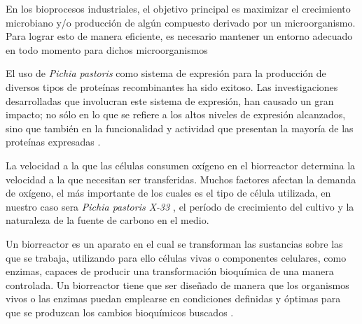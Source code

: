 \setlength{\parindent}{25pt}
\onehalfspacing
{}

En los bioprocesos industriales, el objetivo principal es maximizar el crecimiento microbiano y/o 
producción de algún compuesto derivado por un microorganismo. Para lograr esto de manera eficiente, es 
necesario mantener un entorno adecuado en todo momento para dichos microorganismos \parencite{Johnssana2015}

El uso de  \emph{Pichia pastoris} como sistema de expresión para la producción de diversos tipos de proteínas recombinantes ha sido exitoso. Las investigaciones desarrolladas que involucran este sistema de expresión, han causado un gran impacto; no sólo en lo que se refiere a los altos niveles de expresión alcanzados, sino que también en la funcionalidad y actividad que presentan la mayoría de las proteínas expresadas \parencite{Macauley2015}.

La velocidad a la que las células consumen oxígeno en el biorreactor determina la velocidad a la que necesitan ser transferidas. Muchos factores afectan la demanda de oxígeno, el más importante de los cuales es el tipo de célula utilizada, en nuestro caso sera \emph{Pichia pastoris X-33} , el período de crecimiento del cultivo y la naturaleza de la fuente de carbono en el medio.

Un biorreactor es un aparato en el cual se transforman las sustancias sobre las que se trabaja, utilizando para ello células vivas o componentes celulares, como enzimas, capaces de producir una transformación bioquímica de una manera controlada. Un biorreactor tiene que ser diseñado de manera que los organismos vivos o las enzimas puedan emplearse en condiciones definidas y óptimas para que se produzcan los cambios bioquímicos buscados \parencite{Henzler2000}.
% 


